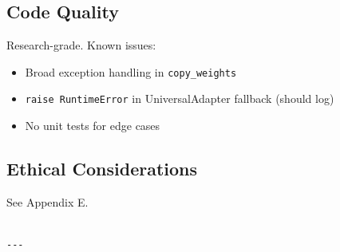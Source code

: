 \subsection{Code Quality}

Research-grade. Known issues:
\begin{itemize}
\item Broad exception handling in \texttt{copy\_weights}
\item \texttt{raise RuntimeError} in UniversalAdapter fallback (should log)
\item No unit tests for edge cases

\end{itemize}
\subsection{Ethical Considerations}

See Appendix E.
\begin{lstlisting}

---
\end{lstlisting}
